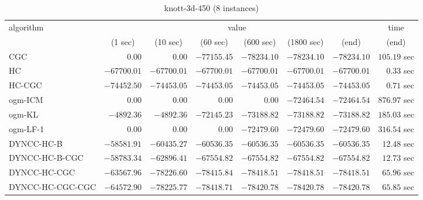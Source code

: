 \begin{table}[H]
\tiny
\centering
\caption{knott-3d-450 (8 instances)}
\label{tab:anytimetable-knott-3d-450}
\begin{tabular}{lrrrrrrr}
\toprule
           algorithm &                                   \multicolumn{6}{c}{value} & \multicolumn{1}{c}{time}   \\  
\cmidrule(lr){2-7}\cmidrule(lr){8-8}  
                     & \multicolumn{1}{c}{(1 sec)} & \multicolumn{1}{c}{(10 sec)} & \multicolumn{1}{c}{(60 sec)} & \multicolumn{1}{c}{(600 sec)} & \multicolumn{1}{c}{(1800 sec)} & \multicolumn{1}{c}{(end)} & \multicolumn{1}{c}{(end)}   \\ \midrule 
                 CGC & $         0.00$ & $         0.00$ & $    -77155.45$ & $    -78234.10$ & $    -78234.10$ & $    -78234.10$ & $       105.19$ sec   \\ 
                  HC & $    -67700.01$ & $    -67700.01$ & $    -67700.01$ & $    -67700.01$ & $    -67700.01$ & $    -67700.01$ & $         0.33$ sec   \\ 
              HC-CGC & $    -74452.50$ & $    -74453.05$ & $    -74453.05$ & $    -74453.05$ & $    -74453.05$ & $    -74453.05$ & $         0.71$ sec   \\ 
             ogm-ICM & $         0.00$ & $         0.00$ & $         0.00$ & $         0.00$ & $    -72464.54$ & $    -72464.54$ & $       876.97$ sec   \\ 
              ogm-KL & $     -4892.36$ & $     -4892.36$ & $    -72145.23$ & $    -73188.82$ & $    -73188.82$ & $    -73188.82$ & $       185.03$ sec   \\ 
            ogm-LF-1 & $         0.00$ & $         0.00$ & $         0.00$ & $    -72479.60$ & $    -72479.60$ & $    -72479.60$ & $       316.54$ sec   \\ 
          DYNCC-HC-B & $    -58581.91$ & $    -60435.27$ & $    -60536.35$ & $    -60536.35$ & $    -60536.35$ & $    -60536.35$ & $        12.48$ sec   \\ 
      DYNCC-HC-B-CGC & $    -58783.34$ & $    -62896.41$ & $    -67554.82$ & $    -67554.82$ & $    -67554.82$ & $    -67554.82$ & $        12.73$ sec   \\ 
        DYNCC-HC-CGC & $    -63567.96$ & $    -78226.60$ & $    -78415.84$ & $    -78418.51$ & $    -78418.51$ & $    -78418.51$ & $        65.96$ sec   \\ 
    DYNCC-HC-CGC-CGC & $    -64572.90$ & $    -78225.77$ & $    -78418.71$ & $    -78420.78$ & $    -78420.78$ & $    -78420.78$ & $        65.85$ sec   \\ 

\end{tabular}
\end{table}
